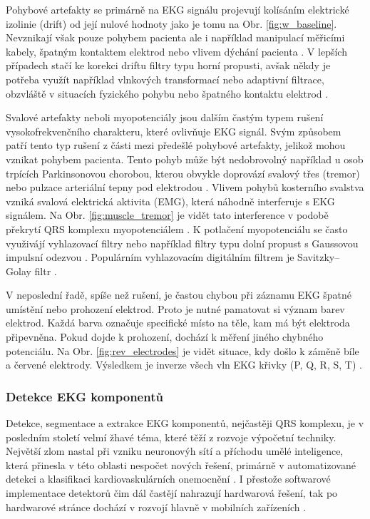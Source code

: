Pohybové artefakty se primárně na EKG signálu projevují kolísáním elektrické
izolinie (drift) od její nulové hodnoty jako je tomu na Obr.
\ref{fig:w_baseline}. Nevznikají však pouze pohybem pacienta ale i například
manipulací měřicími kabely, špatným kontaktem elektrod nebo vlivem dýchání
pacienta \cite{Goldberger2017}. V lepších případech stačí ke korekci driftu
filtry typu horní propusti, avšak někdy je potřeba využít například vlnkových
transformací nebo adaptivní filtrace, obzvláště v situacích fyzického pohybu
nebo špatného kontaktu elektrod \cite{Kher2019}.

Svalové artefakty neboli myopotenciály jsou dalším častým typem rušení
vysokofrekvenčního charakteru, které ovlivňuje EKG signál. Svým způsobem patří
tento typ rušení z části mezi předešlé pohybové artefakty, jelikož mohou vznikat
pohybem pacienta. Tento pohyb může být nedobrovolný například u osob trpících
Parkinsonovou chorobou, kterou obvykle doprovází svalový třes (tremor) nebo
pulzace arteriální tepny pod elektrodou \cite{Surawicz2008}. Vlivem pohybů
kosterního svalstva vzniká svalová elektrická aktivita (EMG), která náhodně
interferuje s EKG signálem. Na Obr. \ref{fig:muscle_tremor} je vidět tato
interference v podobě překrytí QRS komplexu myopotenciálem
\cite{Goldberger2017}. K potlačení myopotenciálu se často využivájí vyhlazovací
filtry nebo například filtry typu dolní propust s Gaussovou impulsní odezvou
\cite{Kher2019}. Populárním vyhlazovacím digitálním filtrem je Savitzky–Golay
filtr \cite{Schafer2011}.

V neposlední řadě, spíše než rušení, je častou chybou při záznamu EKG špatné
umístění nebo prohození elektrod. Proto je nutné pamatovat si význam barev
elektrod. Každá barva označuje specifické místo na těle, kam má být elektroda
připevněna. Pokud dojde k prohození, dochází k měření jiného chybného
potenciálu. Na Obr. \ref{fig:rev_electrodes} je vidět situace, kdy došlo k
záměně bíle a červené elektrody. Výsledkem je inverze všech vln EKG křivky (P,
Q, R, S, T) \cite{Goldberger2017,Surawicz2008}.

\subsubsection{Detekce EKG komponentů}
Detekce, segmentace a extrakce EKG komponentů, nejčastěji QRS komplexu, je v
posledním století velmí žhavé téma, které těží z rozvoje výpočetní techniky.
Největší zlom nastal při vzniku neuronovýh sítí a příchodu umělé inteligence,
která přinesla v této oblasti nespočet nových řešení, primárně v automatizované
detekci a klasifikaci kardiovaskulárních onemocnění \cite{Kashou2020}. I
přestože softwarové implementace detektorů čim dál častějí nahrazují hardwarová
řešení, tak po hardwarové stránce dochází v rozvojí hlavně v mobilních
zařízeních \cite{Kohler2002}.

